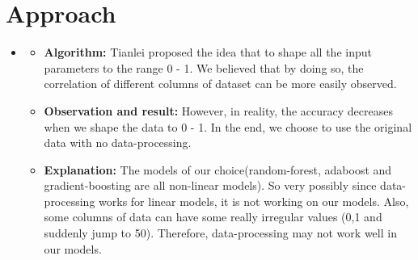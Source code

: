 \section{Approach}
\medskip
\begin{itemize}

    \item {}
    \begin{itemize}
    \item \textbf{Algorithm:} Tianlei proposed the idea that to shape all the input parameters to the range 0 - 1. We believed that by doing so, the correlation of different columns of dataset can be more easily observed.
    \item \textbf{Observation and result:} However, in reality, the accuracy decreases when we shape the data to 0 - 1. In the end, we choose to use the original data with no data-processing.
    \item \textbf{Explanation:} The models of our choice(random-forest, adaboost and gradient-boosting are all non-linear models). So very possibly since data-processing works for linear models, it is not working on our models. Also, some columns of data can have some really irregular values (0,1 and suddenly jump to 50). Therefore, data-processing may not work well in our models.
    \end{itemize}


\end{itemize}
